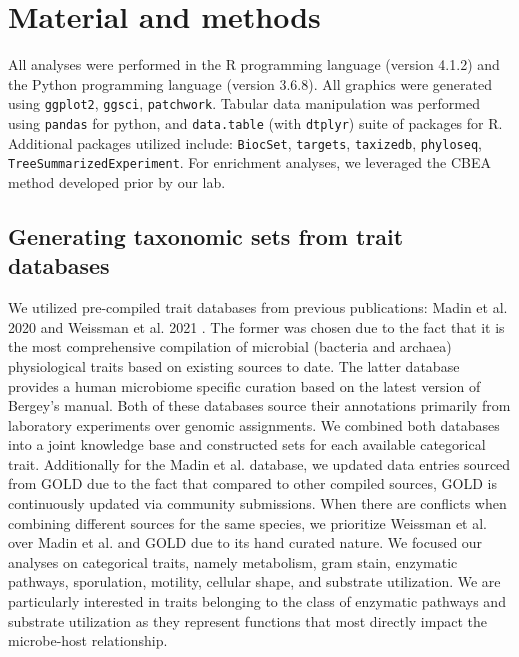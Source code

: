 \documentclass{bmcart}
\begin{document}
\section*{Material and methods}

All analyses were performed in the R programming language (version 4.1.2) \cite{rcoreteam2021language} and the Python programming language (version 3.6.8). All graphics were generated using \texttt{ggplot2}, \texttt{ggsci}, \texttt{patchwork}. Tabular data manipulation was performed using \texttt{pandas} for python, and \texttt{data.table} (with \texttt{dtplyr}) suite of packages for R. Additional packages utilized include: \texttt{BiocSet}, \texttt{targets}, \texttt{taxizedb}, \texttt{phyloseq}, \texttt{TreeSummarizedExperiment}. For enrichment analyses, we leveraged the CBEA \cite{nguyen2021cbea} method developed prior by our lab. 

\subsection*{Generating taxonomic sets from trait databases}  

We utilized pre-compiled trait databases from previous publications: Madin et al. 2020 \cite{madin2020synthesis} and Weissman et al. 2021 \cite{weissman2021exploring}. The former was chosen due to the fact that it is the most comprehensive compilation of microbial (bacteria and archaea) physiological traits based on existing sources to date. The latter database provides a human microbiome specific curation based on the latest version of Bergey's manual. Both of these databases source their annotations primarily from laboratory experiments over genomic assignments. We combined both databases into a joint knowledge base and constructed sets for each available categorical trait. Additionally for the Madin et al. database, we updated data entries sourced from GOLD \cite{mukherjee2021genomes} due to the fact that compared to other compiled sources, GOLD is continuously updated via community submissions. When there are conflicts when combining different sources for the same species, we prioritize Weissman et al. over Madin et al. and GOLD due to its hand curated nature. We focused our analyses on categorical traits, namely metabolism, gram stain, enzymatic pathways, sporulation, motility, cellular shape, and substrate utilization. We are particularly interested in traits belonging to the class of enzymatic pathways and substrate utilization as they represent functions that most directly impact the microbe-host relationship.   
\end{document}
